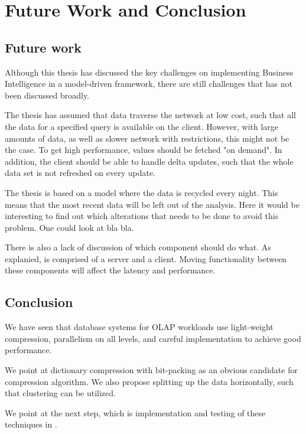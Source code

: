 \chapter{Future Work and Conclusion}
\label{chap:Future Work and Conclusion}

\section{Future work}
Although this thesis has discussed the key challenges on implementing Business Intelligence in a model-driven framework, there are still challenges that has not been discussed broadly.

The thesis has assumed that data traverse the network at low cost, such that all the data for a specified query is available on the client. However, with large amounts of data, as well as slower network with restrictions, this might not be the case. To get high performance, values should be fetched "on demand". In addition, the client should be able to handle delta updates, such that the whole data set is not refreshed on every update.

The thesis is based on a model where the data is recycled every night. This means that the most recent data will be left out of the analysis. Here it would be interesting to find out which alterations that needs to be done to avoid this problem. One could look at bla bla.

There is also a lack of discussion of which component should do what. As explanied, \genusSoftware is comprised of a server and a client. Moving functionality between these components will affect the latency and performance.

\section{Conclusion}
\label{sec:Conclusion}
We have seen that database systems for OLAP workloads use light-weight compression, parallelism on all levels, and careful implementation to achieve good performance.

We point at dictionary compression with bit-packing as an obvious candidate for compression algorithm. We also propose splitting up the data horizontally, such that clustering can be utilized.

We point at the next step, which is implementation and testing of these techniques in \genusSoftware.

